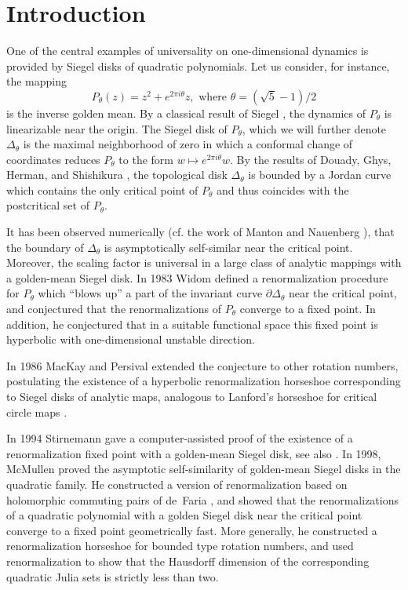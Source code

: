\section{Introduction}



One of the central examples of universality on one-dimensional dynamics is
provided by Siegel disks of quadratic polynomials. Let us consider, for instance,
the mapping 
$$P_\theta(z)=z^2+e^{2\pi i\theta}z,\text{ where }\theta=(\sqrt{5}-1)/2$$
is the inverse golden mean. By a classical result of Siegel \cite{Sieg}, the dynamics of $P_\theta$
is linearizable near the origin. The Siegel disk of $P_\theta$, which we will further
denote $\Delta_\theta$ is the maximal neighborhood of zero in which a conformal
change of coordinates reduces $P_\theta$ to the form $w\mapsto e^{2\pi i\theta}w$.
By the results of Douady, Ghys, Herman, and Shishikura \cite{Do}, the topological disk $\Delta_\theta$
is bounded by  a Jordan curve which contains the only critical point of $P_\theta$ and thus coincides with the
postcritical set of $P_\theta$.


It has  been observed numerically (cf. the work of Manton and Nauenberg \cite{MN}), 
that the boundary of $\Delta_\theta$ is asymptotically
self-similar near the critical point. Moreover, the scaling factor is universal
in a large class of analytic mappings with a golden-mean Siegel disk.
In 1983 Widom \cite{Wi} defined a renormalization procedure for $P_\theta$ which
``blows up'' a part of the invariant curve $\partial \Delta_\theta$ near the critical
point, and conjectured that the renormalizations of $P_\theta$ converge to a fixed point.
In addition, he conjectured that in a suitable functional space this fixed point
is hyperbolic with one-dimensional unstable direction.

In 1986
MacKay and Persival \cite{MP} extended the conjecture to other rotation numbers,
postulating the 
existence of a hyperbolic renormalization horseshoe corresponding to Siegel disks of 
analytic maps,
analogous to Lanford's horseshoe for critical circle maps \cite{La1,La2}. 

In 1994 Stirnemann \cite{Stir} gave a computer-assisted proof of the existence of a
renormalization fixed point with a golden-mean Siegel disk, see also \cite{Bur}.
In 1998, McMullen \cite{McM} proved the asymptotic self-similarity of  golden-mean
Siegel disks in the quadratic family. He constructed a version of renormalization 
based on holomorphic commuting pairs of de~Faria \cite{dF1,dF2}, and
showed that the renormalizations of a quadratic polynomial with a golden Siegel disk
 near the critical point converge
to a fixed point geometrically fast. 
More generally, he constructed a renormalization horseshoe for bounded
type rotation numbers, and used renormalization to show that the Hausdorff dimension of
the corresponding quadratic Julia sets is strictly less than two.

